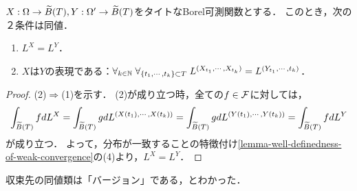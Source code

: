 \documentclass[uplatex,dvipdfmx]{jsreport}
\begin{document}
\begin{lemma}[有限な周辺分布への注目]\label{lemma-equalness-of-distribution-in-terms-of-finite-marginal-distribution}
    $X:\Omega\to\widetilde{B}(T),Y:\Omega'\to\widetilde{B}(T)$をタイトなBorel可測関数とする．
    このとき，次の２条件は同値．
    \begin{enumerate}
        \item $L^X=L^Y$．
        \item $X$は$Y$の表現である：$\forall_{k\in\mathbb{N}}\;\forall_{\{t_1,\cdots,t_k\}\subset T}\;L^{(X_{t_1},\cdots,X_{t_k})}=L^{(Y_{t_1},\cdots,t_k)}$．
    \end{enumerate}
\end{lemma}
\begin{proof}
    (2)$\Rightarrow$(1)を示す．
    (2)が成り立つ時，全ての$f\in\mathcal{F}$に対しては，
    \[\int_{\widetilde{B}(T)}fdL^X=\int_{\widetilde{B}(T)}gdL^{(X(t_1),\cdots,X(t_k))}=\int_{\widetilde{B}(T)}gdL^{(Y(t_1),\cdots,Y(t_k))}=\int_{\widetilde{B}(T)}fdL^Y\]
    が成り立つ．
    よって，分布が一致することの特徴付け\ref{lemma-well-definedness-of-weak-convergence}の(4)より，$L^X=L^Y$．
\end{proof}
\begin{remarks}
    収束先の同値類は「バージョン」である，とわかった．
\end{remarks}
\end{document}
